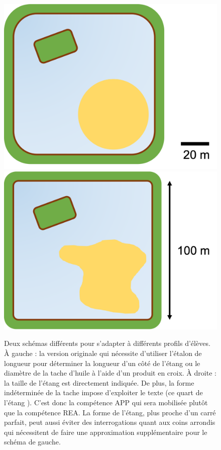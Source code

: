 \documentclass[12pt,a4paper, fleqn]{report}
\newcommand{\app}{\colorbox{bleu_c}{\textcolor{bleu_f}{APP}}}
\newcommand{\rea}{\colorbox{yellow_c}{\textcolor{yellow_f}{REA}}}
\begin{document}
\begin{figure}[h]
\center
\includegraphics[scale=.3]{franklin_lake_diff1.png}
\hfill
\includegraphics[scale=.3]{franklin_lake_diff2.png}

\caption{Deux schémas différents pour s'adapter à différents profils d'élèves.
À gauche : la version originale qui nécessite d'utiliser l'étalon de longueur pour déterminer la longueur d'un côté de l'étang ou le diamètre de la tache d'huile à l'aide d'un produit en croix.
À droite : la taille de l'étang est directement indiquée.
De plus, la forme indéterminée de la tache impose d'exploiter le texte (\og ce quart de l'étang \fg{}).
C'est donc la compétence \app{} qui sera mobilisée plutôt que la compétence \rea{}.
La forme de l'étang, plus proche d'un carré parfait, peut aussi éviter des interrogations quant aux coins arrondis qui nécessitent de faire une approximation supplémentaire pour le schéma de gauche.}

\end{figure}
\end{document}
